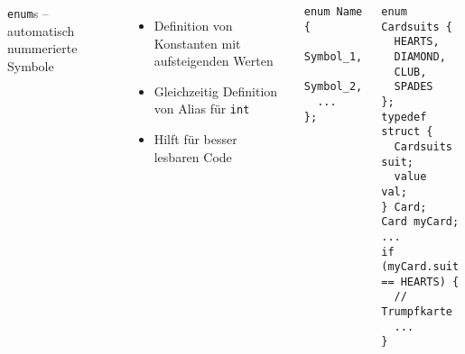 \begin{frame}[fragile]
%
\begin{columns}[T]
\begin{Large}
{\texttt{enum}s -- automatisch nummerierte Symbole}
\vspace{6pt}
\end{Large}
%
\begin{itemize}
\item Definition von Konstanten mit aufsteigenden Werten
\item Gleichzeitig Definition von Alias für \texttt{int}
\item Hilft für besser lesbaren Code
\end{itemize}
%
\begin{codebox}[Syntax]
\begin{verbatim}
enum Name {
  Symbol_1,
  Symbol_2,
  ...
};
\end{verbatim}
\end{codebox}
%
\begin{codebox}[Beispiel]
\begin{verbatim}
enum Cardsuits {
  HEARTS,
  DIAMOND,
  CLUB,
  SPADES
};
typedef struct {
  Cardsuits suit;
  value     val;
} Card;
Card myCard;
...
if (myCard.suit == HEARTS) {
  // Trumpfkarte
  ...
}
\end{verbatim}
\end{codebox}
\end{columns}
%
\end{frame}


